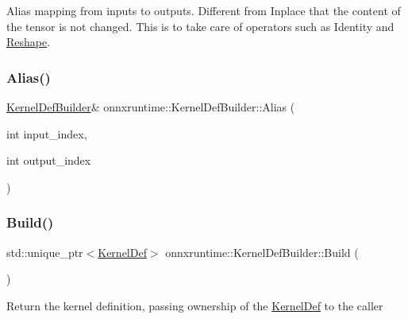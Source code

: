 Alias mapping from inputs to outputs. Different from Inplace that the content of the tensor is not changed. This is to take care of operators such as Identity and \mbox{\hyperlink{classonnxruntime_1_1Reshape}{Reshape}}. \mbox{\label{classonnxruntime_1_1KernelDefBuilder_aabc4fe80ca7f5f0b0562ab51262a216a}} 
\subsubsection{\texorpdfstring{Alias()}{Alias()}\hspace{0.1cm}{\footnotesize\ttfamily [2/2]}}
{\footnotesize\ttfamily \mbox{\hyperlink{classonnxruntime_1_1KernelDefBuilder}{Kernel\+Def\+Builder}}\& onnxruntime\+::\+Kernel\+Def\+Builder\+::\+Alias (\begin{DoxyParamCaption}\item[{int}]{input\+\_\+index,  }\item[{int}]{output\+\_\+index }\end{DoxyParamCaption})\hspace{0.3cm}{\ttfamily [inline]}}

\mbox{\label{classonnxruntime_1_1KernelDefBuilder_ada0f9d0670890071573b8c09305227d5}} 
\subsubsection{\texorpdfstring{Build()}{Build()}}
{\footnotesize\ttfamily std\+::unique\+\_\+ptr$<$\mbox{\hyperlink{classonnxruntime_1_1KernelDef}{Kernel\+Def}}$>$ onnxruntime\+::\+Kernel\+Def\+Builder\+::\+Build (\begin{DoxyParamCaption}{ }\end{DoxyParamCaption})\hspace{0.3cm}{\ttfamily [inline]}}

Return the kernel definition, passing ownership of the \mbox{\hyperlink{classonnxruntime_1_1KernelDef}{Kernel\+Def}} to the caller \mbox{\label{classonnxruntime_1_1KernelDefBuilder_ad4b3599dd2324207a04cb9a7c729fbd3}} 
